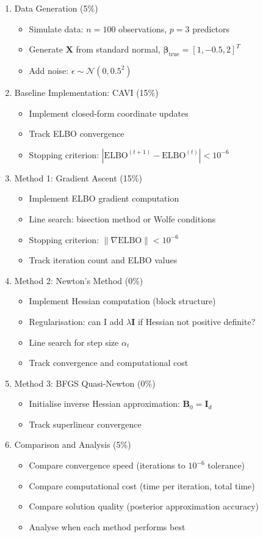 \documentclass[11pt]{article}
\newcommand{\N}{\mathcal{N}}
\newcommand{\ELBO}{\text{ELBO}}
\begin{document}
\begin{enumerate}[leftmargin=*]
\item Data Generation (5\%)
\begin{itemize}
\item Simulate data: $n = 100$ observations, $p = 3$ predictors
\item Generate $\bm{X}$ from standard normal, $\bm{\beta}_{\text{true}} = [1, -0.5, 2]^T$
\item Add noise: $\epsilon \sim \N(0, 0.5^2)$
\end{itemize}

\item Baseline Implementation: CAVI (15\%)
\begin{itemize}
\item Implement closed-form coordinate updates
\item Track ELBO convergence
\item Stopping criterion: $|\ELBO^{(t+1)} - \ELBO^{(t)}| < 10^{-6}$
\end{itemize}

\item Method 1: Gradient Ascent (15\%)
\begin{itemize}
\item Implement ELBO gradient computation
\item Line search: bisection method or Wolfe conditions
\item Stopping criterion: $\|\nabla \ELBO\| < 10^{-6}$
\item Track iteration count and ELBO values
\end{itemize}

\item Method 2: Newton's Method (0\%)
\begin{itemize}
\item Implement Hessian computation (block structure)
\item Regularisation: can I add $\lambda \bm{I}$ if Hessian not positive definite? 
\item Line search for step size $\alpha_t$
\item Track convergence and computational cost
\end{itemize}

\item Method 3: BFGS Quasi-Newton (0\%)
\begin{itemize}
\item Initialise inverse Hessian approximation: $\bm{B}_0 = \bm{I}_d$ 
\item Track superlinear convergence
\end{itemize}

\item Comparison and Analysis (5\%)
\begin{itemize}
\item Compare convergence speed (iterations to $10^{-6}$ tolerance)
\item Compare computational cost (time per iteration, total time)
\item Compare solution quality (posterior approximation accuracy)
\item Analyse when each method performs best
\end{itemize}
\end{enumerate}
\newpage
\end{document}
